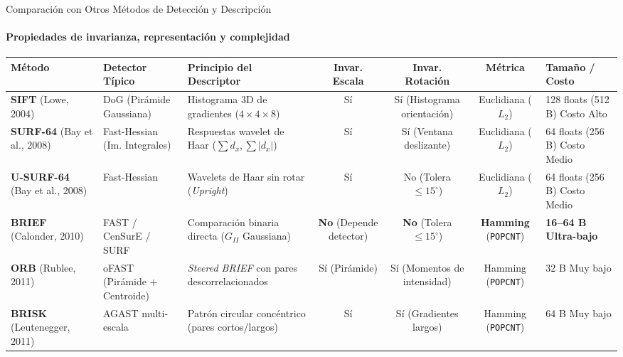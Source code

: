 \documentclass{beamer}
\begin{document}
\begin{frame}{Comparación con Otros Métodos de Detección y Descripción}
\framesubtitle{Propiedades de invarianza, representación y complejidad}
\centering
\tiny
\renewcommand{\arraystretch}{1.28}
\setlength{\tabcolsep}{3.5pt}
\begin{tabular}{p{1.55cm}p{1.65cm}p{2.25cm}ccc p{1.55cm}}
\toprule
\textbf{Método} & \textbf{Detector Típico} & \textbf{Principio del Descriptor} & \textbf{Invar. Escala} & \textbf{Invar. Rotación} & \textbf{Métrica} & \textbf{Tamaño / Costo} \\
\midrule
\textbf{SIFT} \newline (Lowe, 2004) & DoG (Pirámide Gaussiana) & Histograma 3D de gradientes ($4\times4\times8$) & Sí & Sí (Histograma orientación) & Euclidiana ($L_2$) & 128 floats (512 B) \newline Costo Alto \\
\textbf{SURF-64} \newline (Bay et al., 2008) & Fast-Hessian (Im. Integrales) & Respuestas wavelet de Haar ($\sum d_x, \sum|d_x|$) & Sí & Sí (Ventana deslizante) & Euclidiana ($L_2$) & 64 floats (256 B) \newline Costo Medio \\
\textbf{U-SURF-64} \newline (Bay et al., 2008) & Fast-Hessian & Wavelets de Haar sin rotar (\emph{Upright}) & Sí & No (Tolera $\le 15^\circ$) & Euclidiana ($L_2$) & 64 floats (256 B) \newline Costo Medio \\
\textbf{BRIEF} \newline (Calonder, 2010) & FAST / CenSurE / SURF & Comparación binaria directa ($G_{II}$ Gaussiana) & \textbf{No} (Depende detector) & \textbf{No} (Tolera $\le 15^\circ$) & \textbf{Hamming} (\texttt{POPCNT}) & \textbf{16--64 B} \newline \textbf{Ultra-bajo} \\
\textbf{ORB} \newline (Rublee, 2011) & oFAST (Pirámide + Centroide) & \emph{Steered BRIEF} con pares descorrelacionados & Sí (Pirámide) & Sí (Momentos de intensidad) & Hamming (\texttt{POPCNT}) & 32 B \newline Muy bajo \\
\textbf{BRISK} \newline (Leutenegger, 2011) & AGAST multi-escala & Patrón circular concéntrico (pares cortos/largos) & Sí & Sí (Gradientes largos) & Hamming (\texttt{POPCNT}) & 64 B \newline Muy bajo \\
\bottomrule
\end{tabular}
\end{frame}
\end{document}
